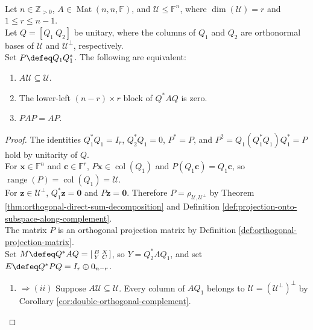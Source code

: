 \begin{theorem} \label{thm:matrix-invariant-subspace-projection-block-criteria} \\
Let $n\in\mathbb{Z}_{>0}$, $A\in\operatorname{Mat}(n,n,\mathbb{F})$, and $\mathcal{U}\leq\mathbb{F}^n$, where $\dim(\mathcal{U})=r$ and $1\leq r\leq n-1$.\\
Let $Q=[Q_1\ Q_2]$ be unitary, where the columns of $Q_1$ and $Q_2$ are orthonormal bases of $\mathcal{U}$ and $\mathcal{U}^{\perp}$, respectively.\\
Set $P\defeq Q_1Q_1^*$. The following are equivalent:
\begin{enumerate}[label=(\roman*)]
\setlength{\itemsep}{0pt}
\item $A\mathcal{U}\subseteq\mathcal{U}$.
\item The lower-left $(n-r)\times r$ block of $Q^*AQ$ is zero.
\item $PAP=AP$.
\end{enumerate}
\begin{proof}
The identities $Q_1^*Q_1=I_r$, $Q_2^*Q_1=0$, $P^*=P$, and $P^2=Q_1(Q_1^*Q_1)Q_1^*=P$ hold by unitarity of $Q$.\\
For $\mathbf{x}\in\mathbb{F}^n$ and $\mathbf{c}\in\mathbb{F}^r$, $P\mathbf{x}\in\operatorname{col}(Q_1)$ and $P(Q_1\mathbf{c})=Q_1\mathbf{c}$, so $\operatorname{range}(P)=\operatorname{col}(Q_1)=\mathcal{U}$.\\
For $\mathbf{z}\in\mathcal{U}^{\perp}$, $Q_1^*\mathbf{z}=\mathbf{0}$ and $P\mathbf{z}=\mathbf{0}$. Therefore $P=\rho_{\mathcal{U},\mathcal{U}^{\perp}}$ by Theorem \ref{thm:orthogonal-direct-sum-decomposition} and Definition \ref{def:projection-onto-subspace-along-complement}.\\
The matrix $P$ is an orthogonal projection matrix by Definition \ref{def:orthogonal-projection-matrix}.\\
Set $M\defeq Q^*AQ=\left[\begin{smallmatrix}B&X\\Y&C\end{smallmatrix}\right]$, so $Y=Q_2^*AQ_1$, and set $E\defeq Q^*PQ=I_r\oplus0_{n-r}$.
\begin{enumerate}[label=(\roman*)]
\setlength{\itemsep}{0pt}
\item[$(i)$] $\Rightarrow (ii)$ Suppose $A\mathcal{U}\subseteq\mathcal{U}$. Every column of $AQ_1$ belongs to $\mathcal{U}=(\mathcal{U}^{\perp})^{\perp}$ by Corollary \ref{cor:double-orthogonal-complement}.\\

\end{enumerate}
\end{proof}
\end{theorem}
